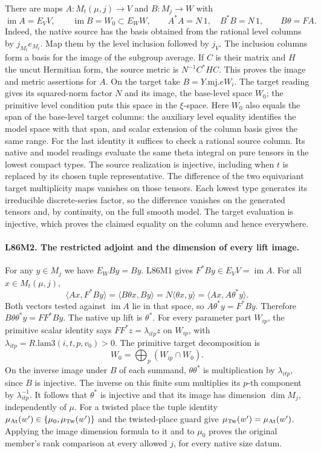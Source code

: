 There are maps $A:M_t(\mu,j)\to V$ and $B:M_j\to W$ with
\[
 \operatorname{im} A=E_V V,\qquad
 \operatorname{im} B=W_0\subset E_W W,\qquad
 A^*A=N\,1,\quad B^*B=N\,1,\qquad B\theta=FA.
\]
Indeed, the native source has the basis obtained from the rational
level columns by $j_{M_t}e_{M_t}$. Map them by the level inclusion
followed by $j_V$. The inclusion columns form a basis for the image
of the subgroup average. If $C$ is their matrix and $H$ the uncut
Hermitian form, the source metric is $N^{-1} C^*HC$. This proves
the image and metric assertions for $A$. On the target take
$B=Y.\mathrm{mj}.eW_i$. The target reading gives its squared-norm
factor $N$ and its image, the base-level space $W_0$; the
primitive level condition puts this space in the $\xi$-space.
Here $W_0$ also equals the span of the base-level target columns:
the auxiliary level equality identifies the model space with that
span, and scalar extension of the column basis gives the same range.
For the last identity it suffices to check a rational source column.
Its native and model readings evaluate the same theta integral
on pure tensors in the lowest compact types. The source realization
is injective, including when $t$ is replaced by its chosen tuple
representative. The difference of the two equivariant target
multiplicity maps vanishes on those tensors. Each lowest type
generates its irreducible discrete-series factor, so the difference
vanishes on the generated tensors and, by continuity, on the full
smooth model. The target evaluation is injective, which proves the
claimed equality on the column and hence everywhere.

\paragraph{L86M2. The restricted adjoint and the dimension of every lift image.}
For any $y\in M_j$ we have $E_WBy=By$. L86M1 gives
$F^*By\in E_VV=\operatorname{im} A$. For all $x\in M_t(\mu,j)$,
\[
 \langle Ax,F^*By\rangle
 =\langle B\theta x,By\rangle=N\langle\theta x,y\rangle
 =\langle Ax,A\theta^*y\rangle .
\]
Both vectors tested against $\operatorname{im}A$ lie in that space,
so $A\theta^*y=F^*By$. Therefore
$B\theta\theta^*y=FF^*By$. The native up lift is $\theta^*$.
For every parameter part $W_{ip}$, the primitive scalar identity
says $FF^*z=\lambda_{itp}z$ on $W_{ip}$, with
$\lambda_{itp}=R.\mathrm{lam3}(i,t,p,v_0)>0$. The primitive
target decomposition is
\[
 W_0=\bigoplus_p (W_{ip}\cap W_0).
\]
On the inverse image under $B$ of each summand,
$\theta\theta^*$ is multiplication by $\lambda_{itp}$, since $B$
is injective. The inverse on this finite sum multiplies its $p$-th
component by $\lambda_{itp}^{-1}$. It follows that $\theta^*$ is
injective and that its image has dimension $\dim M_j$, independently
of $\mu$. For a twisted place the tuple identity
$\mu_{\rm At}(w')\in\{\mu_0,\mu_{\rm Tw}(w')\}$ and the twisted-place
guard give $\mu_{\rm Tw}(w')=\mu_{\rm At}(w')$. Applying the image
dimension formula to it and to $\mu_0$ proves the original member's
rank comparison at every allowed $j$, for every native size datum.

